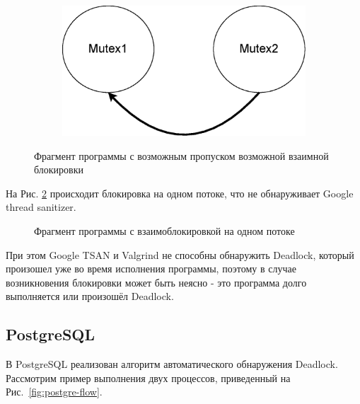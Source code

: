 \begin{figure}[htbp]
    \centering
    \begin{subfigure}[h]{0.4\textwidth}
        \centering
        
    \end{subfigure}
    \hfill
    \begin{subfigure}[h]{0.4\textwidth}
        \centering
        \includegraphics[width=\textwidth]{inc/chapter-first/2m2t-du.eps}
    \end{subfigure}
    \caption{Фрагмент программы с возможным пропуском возможной взаимной блокировки}
    \label{fig:2m2t-du}
\end{figure}

На Рис. \ref{fig:1m1t-d} происходит блокировка на одном потоке, что не обнаруживает Google thread sanitizer.

\begin{figure}[htbp]

 \caption{Фрагмент программы с взаимоблокировкой на одном потоке}
 \label{fig:1m1t-d}
\end{figure}

При этом Google TSAN и Valgrind не способны обнаружить Deadlock, который произошел уже во время исполнения программы, поэтому в случае возникновения блокировки может быть неясно - это программа долго выполняется или произошёл Deadlock.

\subsection{PostgreSQL}

В PostgreSQL реализован алгоритм автоматического обнаружения Deadlock\cite{ref_postgre_deadlock}. Рассмотрим пример выполнения двух процессов, приведенный на Рис.~\ref{fig:postgre-flow}.

